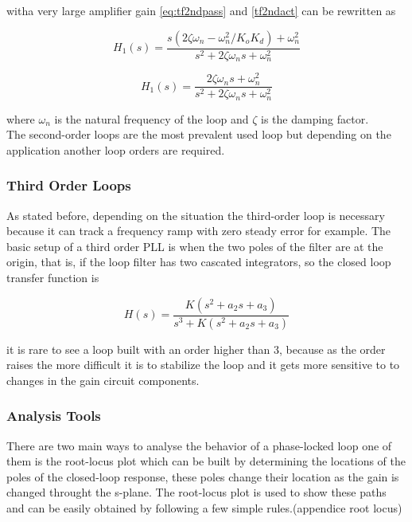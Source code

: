 witha very large amplifier gain \ref{eq:tf2ndpass} and \ref{tf2ndact} can be 
rewritten as

\begin{equation}
    H_1(s)= \frac{s(2\zeta\omega_n-\omega_n^2/K_oK_d)+\omega_n^2}
    {s^2+2\zeta\omega_ns+\omega_n^2}
    \label{eq:damph1}
\end{equation}

\begin{equation}
    H_1(s)= \frac{2\zeta\omega_ns+\omega_n^2}
    {s^2+2\zeta\omega_ns+\omega_n^2}
    \label{eq:damph2}
\end{equation}

where $\omega_n$ is the natural frequency of the loop and $\zeta$ is the damping
factor.\\

The second-order loops are the most prevalent used loop but depending on the
application another loop orders are required.

\subsubsection{Third Order Loops}

As stated before, depending on the situation the third-order loop is necessary
because it can track a frequency ramp with zero steady error for example. The
basic setup of a third order PLL is when the two poles of the filter are at the
origin, that is, if the loop filter has two cascated integrators, so the closed
loop transfer function is

\begin{equation}
    H(s)=\frac{K(s^2+a_2s+a_3)}{s^3+K(s^2+a_2s+a_3)}
    \label{eq:tf3rd}
\end{equation}

it is rare to see a loop built with an order higher than 3, because as the order
raises the more difficult it is to stabilize the loop and it gets more sensitive
to to changes in the gain circuit components.

\subsubsection{Analysis Tools}
There are two main ways to analyse the behavior of a phase-locked loop one of
them is the root-locus plot which can be built by determining the locations of
the poles of the closed-loop response, these poles change their location as the
gain is changed throught the s-plane. The root-locus plot is used to show these
paths and can be easily obtained by following a few simple rules.(appendice root
locus)

